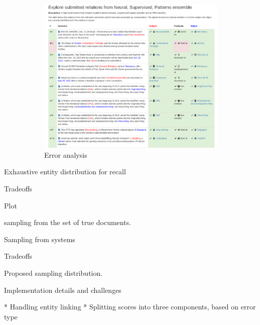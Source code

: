 \begin{figure}
  \begin{subfigure}{0.8\textwidth}
    \includegraphics[width=\textwidth]{figures/interface/errors}
    \caption{Error analysis}
  \end{subfigure}

  \caption[Comparison of relation sampling distributions]{\label{fig:kbpo:selective_supervised_relation}
  }
\end{figure}



Exhaustive entity distribution for recall

Tradeoffs

Plot

sampling from the set of true documents.

Sampling from systems

Tradeoffs

Proposed sampling distribution.

Implementation details and challenges

* Handling entity linking
* Splitting scores into three components, based on error type

